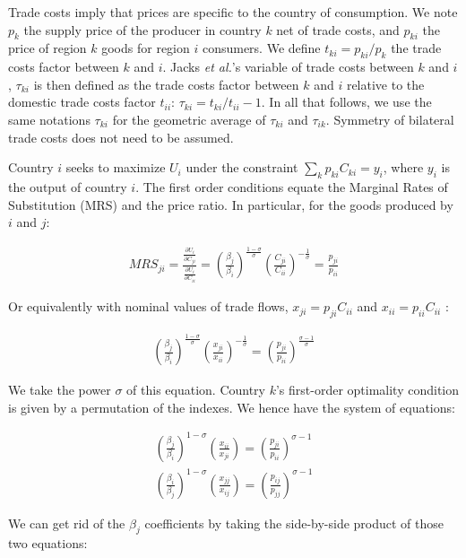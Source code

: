 \documentclass{article}
\begin{document}
Trade costs imply that prices are specific to the country of
consumption. We note $p_k$ the supply price of the producer in
country $k$ net of trade costs, and $p_{ki}$ the price of
region $k$ goods for region $i$ consumers. We define
$t_{ki}=p_{ki}/p_{k}$ the trade costs factor between $k$ and
$i$. Jacks \textit{et al.}'s variable of trade costs between $k$ and
$i$, $\tau_{ki}$ is then defined as the trade costs factor
between $k$ and $i$ relative to the domestic trade costs factor
$t_{ii}$: $\tau_{ki}=t_{ki}/t_{ii}-1$. In all that follows, we
use the same notations $\tau_{ki}$ for the geometric average of
$\tau_{ki}$ and $\tau_{ik}$. Symmetry of bilateral trade costs
does not need to be assumed.

Country $i$ seeks to maximize $U_i$ under the constraint
$\sum_k p_{ki} C_{ki}=y_i$, where $y_i$ is the output of
country $i$. The first order conditions equate the Marginal
Rates of Substitution (MRS) and the price ratio. In particular,
for the goods produced by $i$ and $j$:

\begin{eqnarray*}
MRS_{ji}=\frac{\frac{\partial U_i}{\partial C_{ji}}}{\frac{\partial
U_i}{\partial C_{ii}}}=
\left(\frac{\beta_j}{\beta_i}\right)^{\frac{1-\sigma}{\sigma}}\left(\frac{C_{ji}}{C_{ii}}\right)^{-\frac{1}{\sigma}}=\frac{p_{ji}}{p_{ii}}
\end{eqnarray*}

Or equivalently with nominal values of trade flows,
$x_{ji}=p_{ji}C_{ii}$ and $x_{ii}=p_{ii}C_{ii}$ :

\begin{eqnarray*}
\left(\frac{\beta_j}{\beta_i}\right)^{\frac{1-\sigma}{\sigma}}\left(\frac{x_{ji}}{x_{ii}}\right)^{-\frac{1}{\sigma}}=\left(\frac{p_{ji}}{p_{ii}}\right)^{\frac{\sigma-1}{\sigma}}
\end{eqnarray*}

We take the power $\sigma$ of this equation. Country $k$'s
first-order optimality condition is given by a permutation of
the indexes. We hence have the system of equations:

\begin{eqnarray*}
\left(\frac{\beta_j}{\beta_i}\right)^{1-\sigma}\left(\frac{x_{ii}}{x_{ji}}\right)=\left(\frac{p_{ji}}{p_{ii}}\right)^{\sigma-1}\\
\left(\frac{\beta_i}{\beta_j}\right)^{1-\sigma}\left(\frac{x_{jj}}{x_{ij}}\right)=\left(\frac{p_{ij}}{p_{jj}}\right)^{\sigma-1}
\end{eqnarray*}

We can get rid of the $\beta_j$ coefficients by taking the
side-by-side product of those two equations:
\end{document}
